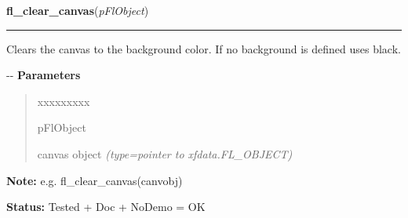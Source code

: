 \hspace{.8\funcindent}\begin{boxedminipage}{\funcwidth}

    \raggedright \textbf{fl\_clear\_canvas}(\textit{pFlObject})

    \vspace{-1.5ex}

    \rule{\textwidth}{0.5\fboxrule}
\setlength{\parskip}{2ex}

Clears the canvas to the background color. If no background is
defined uses black.

-{}-
\setlength{\parskip}{1ex}
      \textbf{Parameters}
      \vspace{-1ex}

      \begin{quote}
        \begin{Ventry}{xxxxxxxxx}

          \item[pFlObject]


canvas object
            {\it (type=pointer to xfdata.FL\_OBJECT)}

        \end{Ventry}

      \end{quote}

\textbf{Note:} 
e.g. fl\_clear\_canvas(canvobj)


\textbf{Status:} 
Tested + Doc + NoDemo = OK


    \end{boxedminipage}

    \label{xformslib:flcanvas:fl_modify_canvas_prop}

    \vspace{0.5ex}

